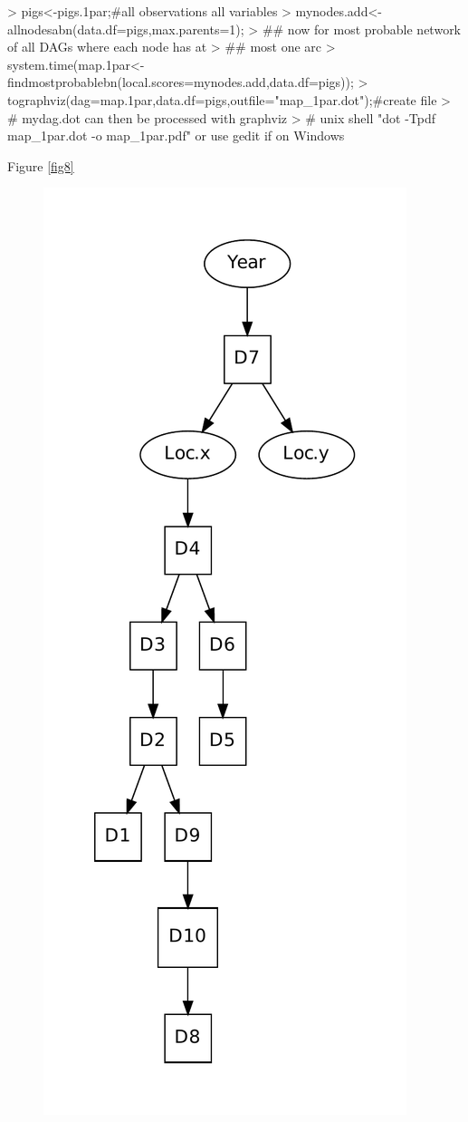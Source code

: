 \documentclass[nojss]{jss}
\begin{document}
\begin{Schunk}
\begin{Sinput}
> pigs<-pigs.1par;#all observations all variables
> mynodes.add<-allnodesabn(data.df=pigs,max.parents=1); 
> ## now for most probable network of all DAGs where each node has at
> ## most one arc
> system.time(map.1par<-findmostprobablebn(local.scores=mynodes.add,data.df=pigs));
> tographviz(dag=map.1par,data.df=pigs,outfile="map_1par.dot");#create file
> # mydag.dot can then be processed with graphviz
> # unix shell "dot -Tpdf map_1par.dot -o map_1par.pdf" or use gedit if on Windows
\end{Sinput}
\end{Schunk}
\clearpage
Figure \ref{fig8}
\begin{figure}[htb]\hspace{4.0cm}
\includegraphics[angle=0,scale=0.5]{map_1par}

\end{figure}
\end{document}
